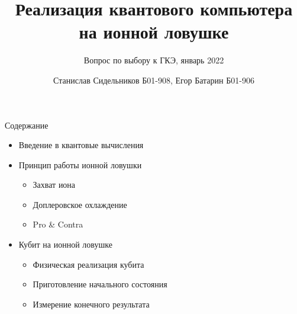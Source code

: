 \documentclass{beamer}
\title{Реализация квантового компьютера на ионной ловушке}
\subtitle{Вопрос по выбору к ГКЭ, январь 2022}
\author{Станислав Сидельников Б01-908, Егор Батарин Б01-906}
\institute{Московский физико-технический институт}
\date{}
\begin{document}
    
    \begin{frame}
        \titlepage
    \end{frame}

    \begin{frame}{Содержание}

        \begin{itemize}

            \item<1-> Введение в квантовые вычисления

      

            \item<2-> Принцип работы ионной ловушки

                \begin{itemize}
                    \item{Захват иона}
                    \item{Доплеровское охлаждение}
                    \item{Pro \& Contra}
                \end{itemize}

            \item<3-> Кубит на ионной ловушке

                \begin{itemize}


                    \item{Физическая реализация кубита}
                    \item{Приготовление начального состояния}
                    \item{Измерение конечного результата}

                \end{itemize}
            
            \end{itemize}

                
        \end{frame}

	\begin{frame}
		\titlepage
	\end{frame}
	
\end{document}
